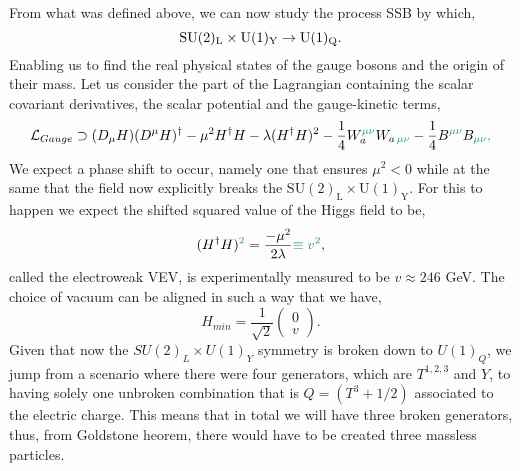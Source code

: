 From what was defined above, we can now study the process  SSB by which, 
%
\begin{equation}\label{eq:breaking_SSB}
\mathrm{SU}(2)_{\mathrm{L}}\times\mathrm{U}(1)_{\mathrm{Y}} \rightarrow \mathrm{U}(1)_{\mathrm{Q}}.
\end{equation} 
%
 Enabling us to find the real physical states of the gauge bosons and the origin of their mass. Let us  consider the part of the Lagrangian containing the scalar covariant derivatives, the scalar potential and the gauge-kinetic terms,
%
\begin{equation}
\mathcal{L}_{Gauge} \supset (D_\mu H)(D^\mu H)^\dagger - \mu^2 H^\dagger H - \lambda (H^\dagger H)^2 - \frac{1}{4}  W^{\Joaoadd{\mu\nu}}_a W_{a \,\Joaoadd{\mu\nu}}  
- \frac{1}{4}  B^{\Joaoadd{\mu\nu}} B_{\Joaoadd{\mu\nu}}\Joaoadd{,}
\label{eq:GaugeSM}
\end{equation} 
% 
We expect a phase shift to occur, namely one that ensures $\mu^2 < 0$ while at the same  that the field now explicitly breaks the $\mathrm{SU(2)_L \times U(1)_Y}$. For this to happen we expect the shifted squared value of the Higgs field to be,
%
\begin{equation}\label{eq:vev}
(H^\dagger H)^{\Joaoadd{2}} = \frac{-\mu^2}{2\lambda} \Joaoadd{\equiv v^2}, 
\end{equation} 
 called the electroweak VEV, is experimentally measured to be $v \approx 246$ GeV. 
%
The choice of vacuum can be aligned in such a way that we have,
\begin{equation}\label{eq:vev_expansion}
H_{min} = \frac{1}{\sqrt{2}} \begin{pmatrix} 0 \\
v 
\end{pmatrix}.
\end{equation}
Given that now the $SU(2)_L \times U(1)_Y$ symmetry is broken down to $U(1)_Q$, we jump from a scenario where there were four generators, which are $T^{1,2,3}$ and $Y$, to having solely one unbroken combination that is $Q =  (T^3 + 1/2)$ associated to the electric charge. This means that in total we will have three broken generators, thus, from  Goldstone heorem, there would have to be created three massless particles. 

